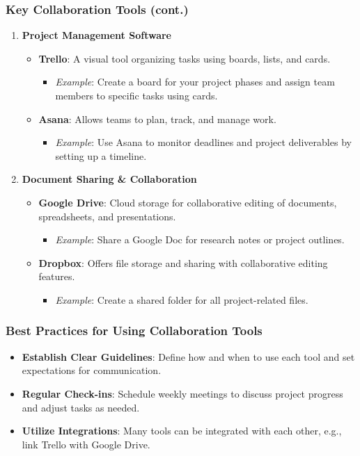 \documentclass[aspectratio=169]{beamer}
\begin{document}
\begin{frame}[fragile]
    \frametitle{Key Collaboration Tools (cont.)}
    \begin{enumerate}[resume]
        \item \textbf{Project Management Software}
        \begin{itemize}
            \item \textbf{Trello}: A visual tool organizing tasks using boards, lists, and cards.
              \begin{itemize}
                  \item \textit{Example}: Create a board for your project phases and assign team members to specific tasks using cards.
              \end{itemize}
            \item \textbf{Asana}: Allows teams to plan, track, and manage work.
              \begin{itemize}
                  \item \textit{Example}: Use Asana to monitor deadlines and project deliverables by setting up a timeline.
              \end{itemize}
        \end{itemize}
        
        \item \textbf{Document Sharing \& Collaboration}
        \begin{itemize}
            \item \textbf{Google Drive}: Cloud storage for collaborative editing of documents, spreadsheets, and presentations.
              \begin{itemize}
                  \item \textit{Example}: Share a Google Doc for research notes or project outlines.
              \end{itemize}
            \item \textbf{Dropbox}: Offers file storage and sharing with collaborative editing features.
              \begin{itemize}
                  \item \textit{Example}: Create a shared folder for all project-related files.
              \end{itemize}
        \end{itemize}
    \end{enumerate}
\end{frame}

\begin{frame}[fragile]
    \frametitle{Best Practices for Using Collaboration Tools}
    \begin{itemize}
        \item \textbf{Establish Clear Guidelines}: Define how and when to use each tool and set expectations for communication.
        \item \textbf{Regular Check-ins}: Schedule weekly meetings to discuss project progress and adjust tasks as needed.
        \item \textbf{Utilize Integrations}: Many tools can be integrated with each other, e.g., link Trello with Google Drive.
    \end{itemize}
\end{frame}
\end{document}
